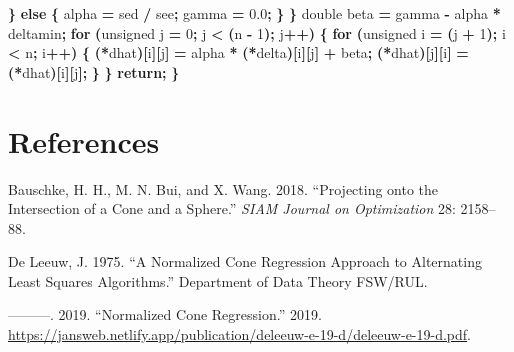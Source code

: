 \documentclass[
  12pt,
]{article}
\newenvironment{Shaded}{\begin{snugshade}}{\end{snugshade}}
\newcommand{\ControlFlowTok}[1]{\textcolor[rgb]{0.13,0.29,0.53}{\textbf{#1}}}
\newcommand{\DataTypeTok}[1]{\textcolor[rgb]{0.13,0.29,0.53}{#1}}
\newcommand{\DecValTok}[1]{\textcolor[rgb]{0.00,0.00,0.81}{#1}}
\newcommand{\FloatTok}[1]{\textcolor[rgb]{0.00,0.00,0.81}{#1}}
\newcommand{\NormalTok}[1]{#1}
\newcommand{\OperatorTok}[1]{\textcolor[rgb]{0.81,0.36,0.00}{\textbf{#1}}}
\newlength{\cslhangindent}
\newenvironment{CSLReferences}[2] %
 {\begin{list}{}{%
  \setlength{\itemindent}{0pt}
  \setlength{\leftmargin}{0pt}
  \setlength{\parsep}{0pt}
  \ifodd #1
   \setlength{\leftmargin}{\cslhangindent}
   \setlength{\itemindent}{-1\cslhangindent}
  \fi
  \setlength{\itemsep}{#2\baselineskip}}}
 {\end{list}}
\begin{document}
\begin{Shaded}
\begin{Highlighting}[]
        \OperatorTok{\}} \ControlFlowTok{else} \OperatorTok{\{}
\NormalTok{            alpha }\OperatorTok{=}\NormalTok{ sed }\OperatorTok{/}\NormalTok{ see}\OperatorTok{;}
\NormalTok{            gamma }\OperatorTok{=} \FloatTok{0.0}\OperatorTok{;}
        \OperatorTok{\}}
    \OperatorTok{\}}
    \DataTypeTok{double}\NormalTok{ beta }\OperatorTok{=}\NormalTok{ gamma }\OperatorTok{{-}}\NormalTok{ alpha }\OperatorTok{*}\NormalTok{ deltamin}\OperatorTok{;}
    \ControlFlowTok{for} \OperatorTok{(}\DataTypeTok{unsigned}\NormalTok{ j }\OperatorTok{=} \DecValTok{0}\OperatorTok{;}\NormalTok{ j }\OperatorTok{\textless{}} \OperatorTok{(}\NormalTok{n }\OperatorTok{{-}} \DecValTok{1}\OperatorTok{);}\NormalTok{ j}\OperatorTok{++)} \OperatorTok{\{}
        \ControlFlowTok{for} \OperatorTok{(}\DataTypeTok{unsigned}\NormalTok{ i }\OperatorTok{=} \OperatorTok{(}\NormalTok{j }\OperatorTok{+} \DecValTok{1}\OperatorTok{);}\NormalTok{ i }\OperatorTok{\textless{}}\NormalTok{ n}\OperatorTok{;}\NormalTok{ i}\OperatorTok{++)} \OperatorTok{\{}
            \OperatorTok{(*}\NormalTok{dhat}\OperatorTok{)[}\NormalTok{i}\OperatorTok{][}\NormalTok{j}\OperatorTok{]} \OperatorTok{=}\NormalTok{ alpha }\OperatorTok{*} \OperatorTok{(*}\NormalTok{delta}\OperatorTok{)[}\NormalTok{i}\OperatorTok{][}\NormalTok{j}\OperatorTok{]} \OperatorTok{+}\NormalTok{ beta}\OperatorTok{;}
            \OperatorTok{(*}\NormalTok{dhat}\OperatorTok{)[}\NormalTok{j}\OperatorTok{][}\NormalTok{i}\OperatorTok{]} \OperatorTok{=} \OperatorTok{(*}\NormalTok{dhat}\OperatorTok{)[}\NormalTok{i}\OperatorTok{][}\NormalTok{j}\OperatorTok{];}
        \OperatorTok{\}}
    \OperatorTok{\}}
    \ControlFlowTok{return}\OperatorTok{;}
\OperatorTok{\}}
\end{Highlighting}
\end{Shaded}

\section*{References}\label{references}

\label{refs}
\begin{CSLReferences}{1}{0}
Bauschke, H. H., M. N. Bui, and X. Wang. 2018. {``{Projecting onto the Intersection of a Cone and a Sphere}.''} \emph{SIAM Journal on Optimization} 28: 2158--88.

De Leeuw, J. 1975. {``{A Normalized Cone Regression Approach to Alternating Least Squares Algorithms}.''} Department of Data Theory FSW/RUL.

---------. 2019. {``Normalized Cone Regression.''} 2019. \url{https://jansweb.netlify.app/publication/deleeuw-e-19-d/deleeuw-e-19-d.pdf}.

\end{CSLReferences}
\end{document}
